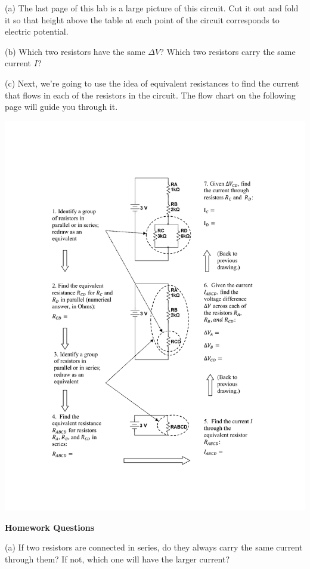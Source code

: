 (a) The last page of this lab is a large picture of this circuit.  Cut it out and fold it so that height above the table at each point of the circuit corresponds to electric potential.  

(b) Which two resistors have the same $\Delta V$?  Which two resistors carry the same current $I$?
\answerspace{0.6 in}

(c) Next, we're going to use the idea of equivalent resistances to find the current that flows in each of the resistors in the circuit.  The flow chart on the following page will guide you through it.

\begin{center}
\includegraphics[height=1.0\textheight]{electric_circuits2/step_by_step_circuit.pdf}
\end{center}

\pagebreak
\textbf{Homework Questions} \par
(a) If two resistors are connected in series, do they always carry the same current through them? If not, which one will have the larger current?
\vspace {0.7 in}

